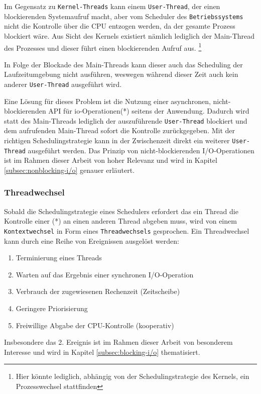 Im Gegensatz zu \verb|Kernel-Threads| kann einem \verb|User-Thread|, der einen blockierenden Systemaufruf macht,
aber vom Scheduler des \verb|Betriebssystems| nicht die Kontrolle über die CPU entzogen werden, da der gesamte Prozess blockiert wäre.
Aus Sicht des Kernels existiert nämlich lediglich der Main-Thread des Prozesses und dieser
führt einen blockierenden Aufruf aus. \footnote{Hier könnte lediglich, abhängig von der Schedulingstrategie des Kernels, ein Prozesswechsel stattfinden}

In Folge der Blockade des Main-Threads kann dieser auch das Scheduling der Laufzeitumgebung nicht ausführen, weswegen während dieser
Zeit auch kein anderer \verb|User-Thread| ausgeführt wird.

Eine Lösung für dieses Problem ist die Nutzung einer asynchronen, nicht-blockierenden API für \gls{io}-Operationen(*)
seitens der Anwendung.
Dadurch wird statt des Main-Threads lediglich der auszuführende \verb|User-Thread| blockiert und dem aufrufenden Main-Thread
sofort die Kontrolle zurückgegeben. Mit der richtigen Schedulingstrategie kann in der Zwischenzeit direkt ein
weiterer \verb|User-Thread| ausgeführt werden. \parencite[Kapitel 2.2.4]{Tanenbaum2016}
Das Prinzip von nicht-blockierenden I/O-Operationen ist im Rahmen dieser Arbeit von hoher Relevanz und wird in Kapitel \ref{subsec:nonblocking-i/o}
genauer erläutert.

\subsubsection{Threadwechsel}
\label{subsubsec:threadwechsel}
Sobald die Schedulingstrategie eines Schedulers erfordert das ein Thread die Kontrolle einer (*) an
einen anderen Thread abgeben muss, wird von einem \verb|Kontextwechsel| in Form eines \verb|Threadwechsels| gesprochen.
Ein Threadwechsel kann durch eine Reihe von Ereignissen ausgelöst werden:
\begin{enumerate}
  \item Terminierung eines Threads
  \item Warten auf das Ergebnis einer synchronen I/O-Operation
  \item Verbrauch der zugewiesenen Rechenzeit (Zeitscheibe)
  \item Geringere Priorisierung
  \item Freiwillige Abgabe der CPU-Kontrolle (kooperativ)
\end{enumerate}

Insbesondere das 2. Ereignis ist im Rahmen dieser Arbeit von besonderem Interesse und wird in Kapitel \ref{subsec:blocking-i/o} thematisiert.

